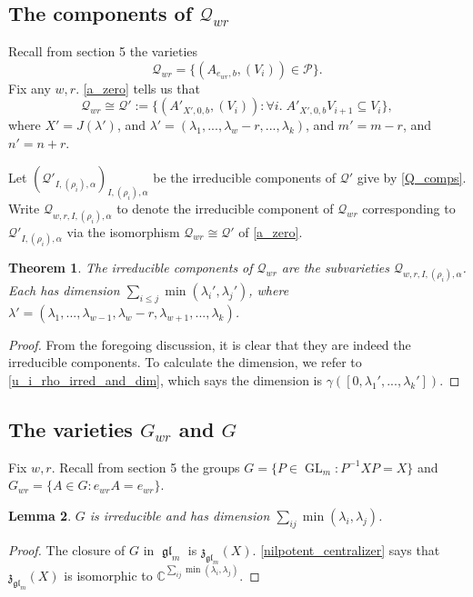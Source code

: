 \documentclass[12pt,psamsfonts]{article}
\DeclareMathOperator{\GL}{GL}
\DeclareMathOperator{\gl}{\mathfrak{gl}}
\newtheorem{theorem}{Theorem}[section]
\newtheorem{lemma}[theorem]{Lemma}
\begin{document}
\subsection{The components of \texorpdfstring{\(\mathcal{Q}_{wr}\)}{Q\_\{wr\}}}
Recall from section 5 the varieties
\[\mathcal{Q}_{wr} = \{(A_{e_{wr}, b}, (V_i)) \in \mathcal{P}\}.\]
Fix any \(w,r\).
\cref{a_zero} tells us that 
\[\mathcal{Q}_{wr} \cong \mathcal{Q}' := \{(A'_{X', 0, b}, (V_i)) : \forall i. \; A'_{X', 0, b} V_{i + 1} \subseteq V_i\},\]
where \(X' = J(\lambda')\), and \(\lambda' = (\lambda_1, ..., \lambda_w - r, ..., \lambda_k)\), and \(m' = m - r\), and \(n' = n + r\).
\par Let \((\mathcal{Q}'_{I, (\rho_i), \alpha})_{I, (\rho_i), \alpha}\) be the irreducible components of \(\mathcal{Q}'\) give by \cref{Q_comps}.
Write \(\mathcal{Q}_{w,r,I,(\rho_i),\alpha}\) to denote the irreducible component of \(\mathcal{Q}_{wr}\) corresponding to \(\mathcal{Q}'_{I, (\rho_i), \alpha}\) via the isomorphism \(\mathcal{Q}_{wr} \cong \mathcal{Q}'\) of \cref{a_zero}.

\begin{theorem}\label{qwr_comps}
    The irreducible components of \(\mathcal{Q}_{wr}\) are the subvarieties \(\mathcal{Q}_{w,r,I,(\rho_i),\alpha}\).
    Each has dimension \(\sum_{i \leq j} \min(\lambda_i', \lambda_j')\), where \(\lambda' = (\lambda_1, ..., \lambda_{w - 1}, \lambda_w - r, \lambda_{w + 1}, ..., \lambda_k)\).
\end{theorem}
\begin{proof}
    From the foregoing discussion, it is clear that they are indeed the irreducible components.
    To calculate the dimension, we refer to \cref{u_i_rho_irred_and_dim}, which says the dimension is \(\gamma([0, \lambda_1', ..., \lambda_k'])\).
\end{proof}

\subsection{The varieties \texorpdfstring{\(G_{wr}\)}{G\_\{wr\}} and \texorpdfstring{\(G\)}{G}}
Fix \(w,r\).
Recall from section 5 the groups \(G = \{P \in \GL_m : P^{-1}XP = X\}\) and \(G_{wr} = \{A \in G : e_{wr} A = e_{wr}\}\).
\begin{lemma}\label{g_irred_dim}
    \(G\) is irreducible and has dimension \(\sum_{ij} \min(\lambda_i, \lambda_j)\).
\end{lemma}
\begin{proof}
    The closure of \(G\) in \(\gl_m\) is \(\mathfrak{z}_{\gl_m}(X)\).
    \cref{nilpotent_centralizer} says that \(\mathfrak{z}_{\gl_m}(X)\) is isomorphic to \(\mathbb{C}^{\sum_{ij} \min(\lambda_i, \lambda_j)}\).
\end{proof}
\end{document}
